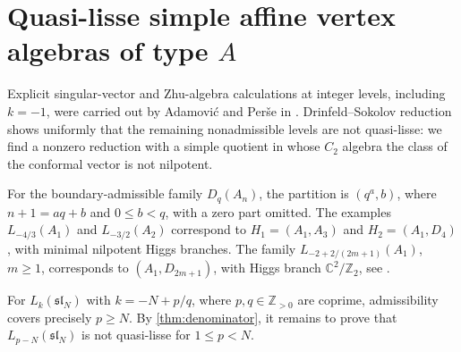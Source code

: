 \documentclass[11pt,a4paper]{amsart}
\numberwithin{equation}{section}
\theoremstyle{definition}
\theoremstyle{remark}
\newcommand{\C}{\mathbb C}
\newcommand{\Z}{\mathbb Z}
\newcommand{\slg}{\mathfrak{sl}}
\begin{document}
\section{\texorpdfstring{Quasi-lisse simple affine vertex algebras of type $A$}{Quasi-lisse simple affine vertex algebras of type A}}\label{sec:type-A}

Explicit singular-vector and Zhu-algebra calculations at integer levels,
including $k=-1$, were carried out by Adamovi\'c and Per\v se in
\cite{APNonrational2008}. Drinfeld--Sokolov reduction shows uniformly that the remaining
nonadmissible levels are not quasi-lisse: we find a nonzero reduction
with a simple quotient in whose $C_2$ algebra the class of the
conformal vector is not nilpotent.

For the boundary-admissible family $D_q(A_n)$, the partition is $(q^a,b)$, where $n+1=aq+b$ and
$0\le b<q$, with a zero part omitted.
The examples $L_{-4/3}(A_1)$ and $L_{-3/2}(A_2)$ correspond to
$H_1=(A_1,A_3)$ and $H_2=(A_1,D_4)$, with minimal nilpotent
Higgs branches. The family $L_{-2+2/(2m+1)}(A_1)$, $m\ge1$,
corresponds to $(A_1,D_{2m+1})$, with Higgs branch
$\C^2/\mathbb Z_2$, see \cite[Sections~4 and~5.2]{BeemRastelli2018}.

For $L_k(\slg_N)$ with $k=-N+p/q$, where $p,q\in\Z_{>0}$ are
coprime, admissibility covers precisely $p\ge N$.
By \cref{thm:denominator}, it remains to prove that
$L_{p-N}(\slg_N)$ is not quasi-lisse for $1\le p<N$.
\end{document}
